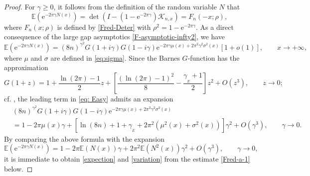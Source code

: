 \documentclass[11pt,a4paper]{article}
\numberwithin{equation}{section}
\begin{document}
\begin{proof}
For $\gamma\geq 0$, it follows from the definition of the random variable $N$ that
\begin{equation}
\mathbb{E}\left(\mathrm{e}^{-2\pi\gamma{N}(x)}\right)=\det\left(I-\left(1-\mathrm{e}^{-2\pi\gamma}\right)
\mathcal{K}_{n,x}\right)=F_n(-x;\rho),
\end{equation}
where $F_n(x;\rho)$ is defined by \eqref{Fred-Deter} with $\rho^2=1-\mathrm{e}^{-2\pi\gamma}$.
As a direct consequence of the  large gap asymptotics \eqref{F-asymptotic-infty2}, we have
\begin{equation}\label{eq: Easy}
\mathbb{E}(\mathrm{e}^{-2\pi\gamma{N}(x)})
=(8n)^{\gamma^2}G(1+i\gamma)G(1-i\gamma)\mathrm{e}^{-2\pi\gamma\mu(x)+2\pi^2\gamma^2\sigma^2(x)}
\left[1+o(1)\right],\qquad x\to+\infty,
\end{equation}
where $\mu$ and $\sigma$ are defined in \eqref{eq:sigma}. Since the Barnes  $G$-function has the approximation
\begin{equation}
G(1+z)=1+\frac{\ln(2\pi)-1}{2}z
+\left[\frac{(\ln(2\pi)-1)^2}{8}-\frac{\gamma_{_E}+1}{2}\right]z^2+O(z^3),
\qquad z\to 0;
\end{equation}
cf. \cite[Equation 5.17.4]{NIST}, the leading term in \eqref{eq: Easy} admits an expansion
\begin{align}\label{Fred-rep-asymp}
& (8n)^{\gamma^2}G(1+i\gamma)G(1-i\gamma)\mathrm{e}^{-2\pi\gamma\mu(x)+2\pi^2\gamma^2\sigma^2(x)}
\nonumber\\
&=1-2\pi\mu(x)\gamma+\left[\ln(8n)+1+\gamma_{_E}+2\pi^2(\mu^2(x)+\sigma^2(x))\right]\gamma^2
+O(\gamma^3),\qquad \gamma\to0.
\end{align}
By comparing the above formula with the expansion
\begin{equation}
\mathbb{E}(\mathrm{e}^{-2\pi\gamma{N}(x)})=1-2\pi\mathbb{E}(N(x))\gamma
+2\pi^2\mathbb{E}(N^2(x))\gamma^2
+O(\gamma^3),\qquad \gamma\to0,
\end{equation}
it is immediate to obtain \eqref{expection} and \eqref{variation} from the estimate \eqref{Fred-a-1} below.


\end{proof}
\end{document}
